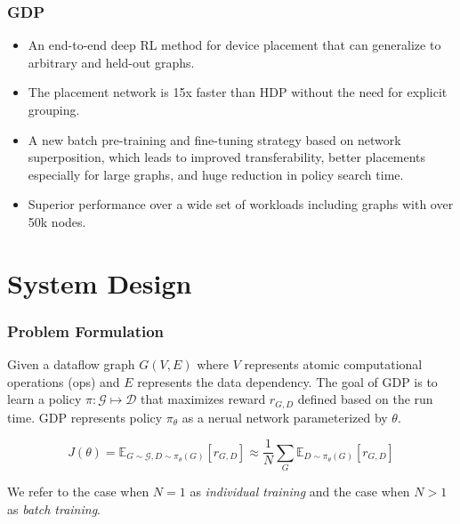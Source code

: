 \documentclass[12pt,aspectratio=169]{beamer}
\begin{document}
    \begin{frame}
        \frametitle{GDP}

        \begin{itemize}
            \setlength{\itemsep}{.8em}
            \item An end-to-end deep RL method for device placement that can generalize to arbitrary and held-out graphs.
            \item The placement network is 15x faster than HDP without the need for explicit grouping.
            \item A new batch pre-training and fine-tuning strategy based on network superposition, which leads to
                  improved transferability, better placements especially for large graphs, and huge reduction in policy
                  search time.
            \item Superior performance over a wide set of workloads including graphs with over 50k nodes.
        \end{itemize}
    \end{frame}

    \section{System Design}

    \begin{frame}
        \frametitle{Problem Formulation}

        Given a dataflow graph $G(V, E)$ where $V$ represents atomic computational operations (ops) and $E$ represents
        the data dependency. The goal of GDP is to learn a policy $\pi: \mathcal{G} \mapsto \mathcal{D}$ that maximizes
        reward $r_{G,D}$ defined based on the run time. GDP represents policy $\pi_\theta$ as a nerual network
        parameterized by $\theta$.

        $$
            J(\theta) = \mathbb{E}_{G\sim{} \mathcal{G}, D\sim \pi_\theta(G)}[r_{G,D}] \approx
            \frac{1}{N}\sum_{G}\mathbb{E}_{D\sim \pi_\theta(G)}[r_{G,D}]
        $$

        We refer to the case when $N=1$ as \textit{individual training} and the case when $N>1$ as \textit{batch training}.
    \end{frame}
\end{document}
